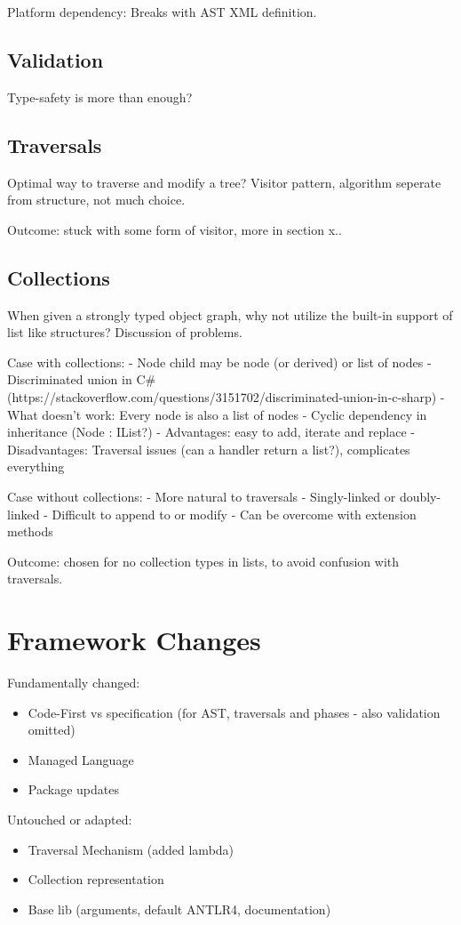 \documentclass[twoside,openright]{uva-bachelor-thesis}
\begin{document}
		Platform dependency: Breaks with AST XML definition.
		
	\section{Validation}
		Type-safety is more than enough?
		
	\section{Traversals}
		Optimal way to traverse and modify a tree? Visitor pattern, algorithm seperate from structure, not much choice.
	
		Outcome: stuck with some form of visitor, more in section x..
		
	\section{Collections}
		When given a strongly typed object graph, why not utilize the built-in support of list like structures? Discussion of problems.
	
		Case with collections:
		- Node child may be node (or derived) or list of nodes
		- Discriminated union in C\# (https://stackoverflow.com/questions/3151702/discriminated-union-in-c-sharp)
		- What doesn't work: Every node is also a list of nodes
		- Cyclic dependency in inheritance (Node : IList?)
		- Advantages: easy to add, iterate and replace
		- Disadvantages: Traversal issues (can a handler return a list?), complicates everything
		
		Case without collections:
		- More natural to traversals
		- Singly-linked or doubly-linked
		- Difficult to append to or modify
		- Can be overcome with extension methods
		
		Outcome: chosen for no collection types in lists, to avoid confusion with traversals.
	
	
\chapter{Framework Changes}
	Fundamentally changed:
	\begin{itemize}
		\item Code-First vs specification (for AST, traversals and phases - also validation omitted)
		\item Managed Language
		\item Package updates
	\end{itemize}
	Untouched or adapted:
	\begin{itemize}
		\item Traversal Mechanism (added lambda)
		\item Collection representation
		\item Base lib (arguments, default ANTLR4, documentation)
	\end{itemize}
	
\end{document}
